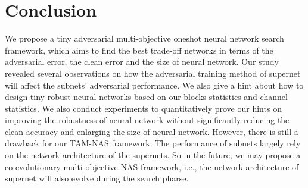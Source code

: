 \documentclass[journal]{IEEEtran}
\begin{document}
\section{Conclusion}
We propose a tiny adversarial multi-objective oneshot neural network search framework, which aims to find the best trade-off networks in terms of the adversarial error, the clean error and the size of neural network. Our study revealed several observations on how the adversarial training method of supernet will affect the subnets' adversarial performance. We also give a hint about how to design tiny robust neural networks based on our blocks statistics and channel statistics. We also conduct experiments to quantitatively prove our hints on improving the robustness of neural network without significantly reducing the clean accuracy and enlarging the size of neural network. However, there is still a drawback for our TAM-NAS framework. The performance of subnets largely rely on the network architecture of the supernets. So in the future, we may propose a co-evolutionary multi-objective NAS framework, i.e., the network architecture of supernet will also evolve during the search pharse.  











\end{document}
